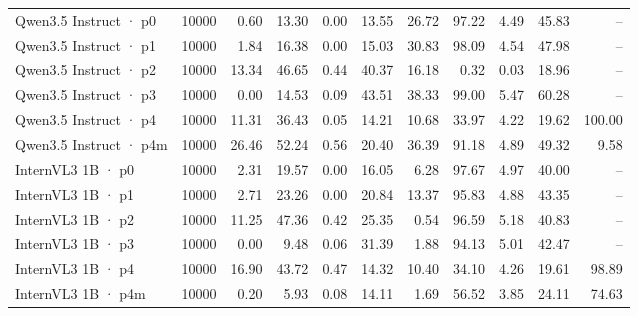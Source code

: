 \begin{tabular}{lrrrrrrrrrr}
Qwen3.5 Instruct · p0 & 10000 & 0.60 & 13.30 & 0.00 & 13.55 & 26.72 & 97.22 & 4.49 & 45.83 & -- \\
Qwen3.5 Instruct · p1 & 10000 & 1.84 & 16.38 & 0.00 & 15.03 & 30.83 & 98.09 & 4.54 & 47.98 & -- \\
Qwen3.5 Instruct · p2 & 10000 & 13.34 & 46.65 & 0.44 & 40.37 & 16.18 & 0.32 & 0.03 & 18.96 & -- \\
Qwen3.5 Instruct · p3 & 10000 & 0.00 & 14.53 & 0.09 & 43.51 & 38.33 & 99.00 & 5.47 & 60.28 & -- \\
Qwen3.5 Instruct · p4 & 10000 & 11.31 & 36.43 & 0.05 & 14.21 & 10.68 & 33.97 & 4.22 & 19.62 & 100.00 \\
Qwen3.5 Instruct · p4m & 10000 & 26.46 & 52.24 & 0.56 & 20.40 & 36.39 & 91.18 & 4.89 & 49.32 & 9.58 \\
InternVL3 1B · p0 & 10000 & 2.31 & 19.57 & 0.00 & 16.05 & 6.28 & 97.67 & 4.97 & 40.00 & -- \\
InternVL3 1B · p1 & 10000 & 2.71 & 23.26 & 0.00 & 20.84 & 13.37 & 95.83 & 4.88 & 43.35 & -- \\
InternVL3 1B · p2 & 10000 & 11.25 & 47.36 & 0.42 & 25.35 & 0.54 & 96.59 & 5.18 & 40.83 & -- \\
InternVL3 1B · p3 & 10000 & 0.00 & 9.48 & 0.06 & 31.39 & 1.88 & 94.13 & 5.01 & 42.47 & -- \\
InternVL3 1B · p4 & 10000 & 16.90 & 43.72 & 0.47 & 14.32 & 10.40 & 34.10 & 4.26 & 19.61 & 98.89 \\
InternVL3 1B · p4m & 10000 & 0.20 & 5.93 & 0.08 & 14.11 & 1.69 & 56.52 & 3.85 & 24.11 & 74.63 \\
\bottomrule
\end{tabular}
